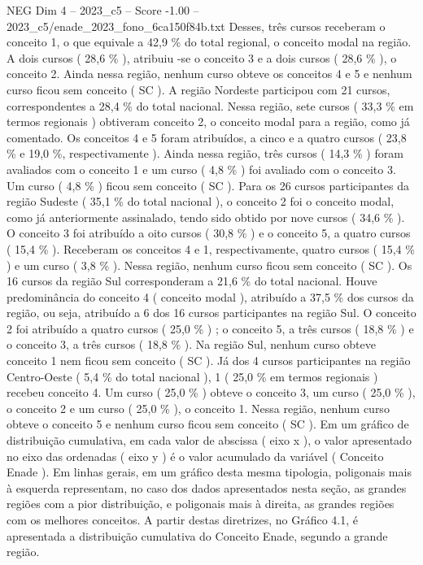 \begin{textsample}{NEG Dim 4 – 2023\_c5 – Score -1.00 – 2023\_c5/enade\_2023\_fono\_6ca150f84b.txt}
Desses, três cursos receberam o conceito 1, o que equivale a 42,9 \% do total regional, o conceito modal na região.
A dois cursos ( 28,6 \% ), atribuiu -se o conceito 3 e a dois cursos ( 28,6 \% ), o conceito 2.
Ainda nessa região, nenhum curso obteve os conceitos 4 e 5 e nenhum curso ficou sem conceito ( SC ).
A região Nordeste participou com 21 cursos, correspondentes a 28,4 \% do total nacional.
Nessa região, sete cursos ( 33,3 \% em termos regionais ) obtiveram conceito 2, o conceito modal para a região, como já comentado.
Os conceitos 4 e 5 foram atribuídos, a cinco e a quatro cursos ( 23,8 \% e 19,0 \%, respectivamente ).
Ainda nessa região, três cursos ( 14,3 \% ) foram avaliados com o conceito 1 e um curso ( 4,8 \% ) foi avaliado com o conceito 3.
Um curso ( 4,8 \% ) ficou sem conceito ( SC ).
Para os 26 cursos participantes da região Sudeste ( 35,1 \% do total nacional ), o conceito 2 foi o conceito modal, como já anteriormente assinalado, tendo sido obtido por nove cursos ( 34,6 \% ).
O conceito 3 foi atribuído a oito cursos ( 30,8 \% ) e o conceito 5, a quatro cursos ( 15,4 \% ).
Receberam os conceitos 4 e 1, respectivamente, quatro cursos ( 15,4 \% ) e um curso ( 3,8 \% ).
Nessa região, nenhum curso ficou sem conceito ( SC ).
Os 16 cursos da região Sul corresponderam a 21,6 \% do total nacional.
Houve predominância do conceito 4 ( conceito modal ), atribuído a 37,5 \% dos cursos da região, ou seja, atribuído a 6 dos 16 cursos participantes na região Sul.
O conceito 2 foi atribuído a quatro cursos ( 25,0 \% ) ; o conceito 5, a três cursos ( 18,8 \% ) e o conceito 3, a três cursos ( 18,8 \% ).
Na região Sul, nenhum curso obteve conceito 1 nem ficou sem conceito ( SC ).
Já dos 4 cursos participantes na região Centro-Oeste ( 5,4 \% do total nacional ), 1 ( 25,0 \% em termos regionais ) recebeu conceito 4.
Um curso ( 25,0 \% ) obteve o conceito 3, um curso ( 25,0 \% ), o conceito 2 e um curso ( 25,0 \% ), o conceito 1.
Nessa região, nenhum curso obteve o conceito 5 e nenhum curso ficou sem conceito ( SC ).
Em um gráfico de distribuição cumulativa, em cada valor de abscissa ( eixo x ), o valor apresentado no eixo das ordenadas ( eixo y ) é o valor acumulado da variável ( Conceito Enade ).
Em linhas gerais, em um gráfico desta mesma tipologia, poligonais mais à esquerda representam, no caso dos dados apresentados nesta seção, as grandes regiões com a pior distribuição, e poligonais mais à direita, as grandes regiões com os melhores conceitos.
A partir destas diretrizes, no Gráfico 4.1, é apresentada a distribuição cumulativa do Conceito Enade, segundo a grande região.

\end{textsample}
